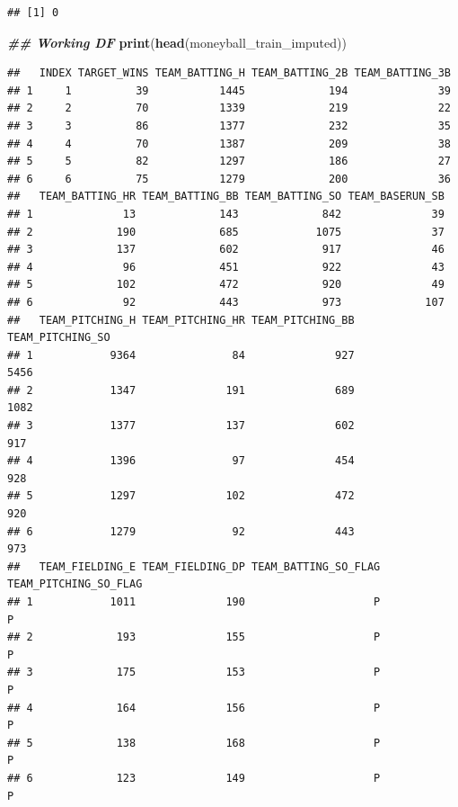 \documentclass[
]{article}
\newenvironment{Shaded}{\begin{snugshade}}{\end{snugshade}}
\newcommand{\DocumentationTok}[1]{\textcolor[rgb]{0.56,0.35,0.01}{\textbf{\textit{#1}}}}
\newcommand{\FunctionTok}[1]{\textcolor[rgb]{0.13,0.29,0.53}{\textbf{#1}}}
\newcommand{\NormalTok}[1]{#1}
\begin{document}
\begin{verbatim}
## [1] 0
\end{verbatim}

\begin{Shaded}
\begin{Highlighting}[]
\DocumentationTok{\#\# Working DF }
\FunctionTok{print}\NormalTok{(}\FunctionTok{head}\NormalTok{(moneyball\_train\_imputed))}
\end{Highlighting}
\end{Shaded}

\begin{verbatim}
##   INDEX TARGET_WINS TEAM_BATTING_H TEAM_BATTING_2B TEAM_BATTING_3B
## 1     1          39           1445             194              39
## 2     2          70           1339             219              22
## 3     3          86           1377             232              35
## 4     4          70           1387             209              38
## 5     5          82           1297             186              27
## 6     6          75           1279             200              36
##   TEAM_BATTING_HR TEAM_BATTING_BB TEAM_BATTING_SO TEAM_BASERUN_SB
## 1              13             143             842              39
## 2             190             685            1075              37
## 3             137             602             917              46
## 4              96             451             922              43
## 5             102             472             920              49
## 6              92             443             973             107
##   TEAM_PITCHING_H TEAM_PITCHING_HR TEAM_PITCHING_BB TEAM_PITCHING_SO
## 1            9364               84              927             5456
## 2            1347              191              689             1082
## 3            1377              137              602              917
## 4            1396               97              454              928
## 5            1297              102              472              920
## 6            1279               92              443              973
##   TEAM_FIELDING_E TEAM_FIELDING_DP TEAM_BATTING_SO_FLAG TEAM_PITCHING_SO_FLAG
## 1            1011              190                    P                     P
## 2             193              155                    P                     P
## 3             175              153                    P                     P
## 4             164              156                    P                     P
## 5             138              168                    P                     P
## 6             123              149                    P                     P

\end{verbatim}
\end{document}
